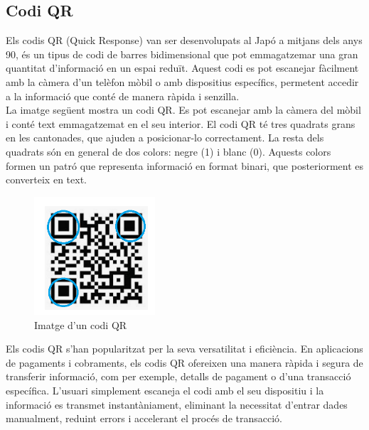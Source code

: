 \documentclass[a4paper,12pt,twoside]{ThesisStyle}
\begin{document}
\subsection{Codi QR}
\label{subsec: Codi QR}

Els codis QR (Quick Response) van ser desenvolupats al Japó a mitjans dels anys 90, és un tipus de codi de barres bidimensional que pot emmagatzemar una gran quantitat d'informació en un espai reduït. Aquest codi es pot escanejar fàcilment amb la càmera d'un telèfon mòbil o amb dispositius específics, permetent accedir a la informació que conté de manera ràpida i senzilla.\\

La imatge següent mostra un codi QR. Es pot escanejar amb la càmera del mòbil i conté text emmagatzemat en el seu interior. El codi QR té tres quadrats grans en les cantonades, que ajuden a posicionar-lo correctament. La resta dels quadrats són en general de dos colors: negre (1) i blanc (0). Aquests colors formen un patró que representa informació en format binari, que posteriorment es converteix en text.\\

\begin{figure}[h!] %
    \centering
    \includegraphics[width=0.4\textwidth]{imatges/qr2.png} %
    \caption{Imatge d'un codi QR} %
    \label{fig:Imatge d'un codi QR} %
  \end{figure}

  Els codis QR s'han popularitzat per la seva versatilitat i eficiència. En aplicacions de pagaments i cobraments, els codis QR ofereixen una manera ràpida i segura de transferir informació, com per exemple, detalls de pagament o d'una transacció específica. L'usuari simplement escaneja el codi amb el seu dispositiu i la informació es transmet instantàniament, eliminant la necessitat d'entrar dades manualment, reduint errors i accelerant el procés de transacció.\\
\end{document}
